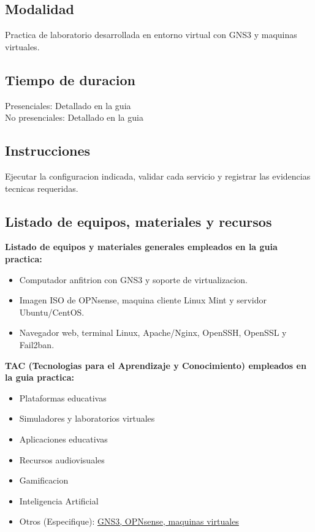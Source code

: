 \documentclass{article}
\renewcommand{\_}{\oldunderscore\hskip0pt\relax}
\begin{document}
\subsection*{Modalidad}
Practica de laboratorio desarrollada en entorno virtual con GNS3 y maquinas virtuales.

\subsection*{Tiempo de duracion}
Presenciales: Detallado en la guia\\
No presenciales: Detallado en la guia

\subsection*{Instrucciones}
Ejecutar la configuracion indicada, validar cada servicio y registrar las evidencias tecnicas requeridas.

\subsection*{Listado de equipos, materiales y recursos}
\textbf{Listado de equipos y materiales generales empleados en la guia practica:}
\begin{itemize}
    \item Computador anfitrion con GNS3 y soporte de virtualizacion.
    \item Imagen ISO de OPNsense, maquina cliente Linux Mint y servidor Ubuntu/CentOS.
    \item Navegador web, terminal Linux, Apache/Nginx, OpenSSH, OpenSSL y Fail2ban.
\end{itemize}

\textbf{TAC (Tecnologias para el Aprendizaje y Conocimiento) empleados en la guia practica:}
\begin{itemize}
    \item[$\square$] Plataformas educativas
    \item[$\boxtimes$] Simuladores y laboratorios virtuales
    \item[$\square$] Aplicaciones educativas
    \item[$\square$] Recursos audiovisuales
    \item[$\square$] Gamificacion
    \item[$\boxtimes$] Inteligencia Artificial
    \item Otros (Especifique): \underline{GNS3, OPNsense, maquinas virtuales}
\end{itemize}
\end{document}
